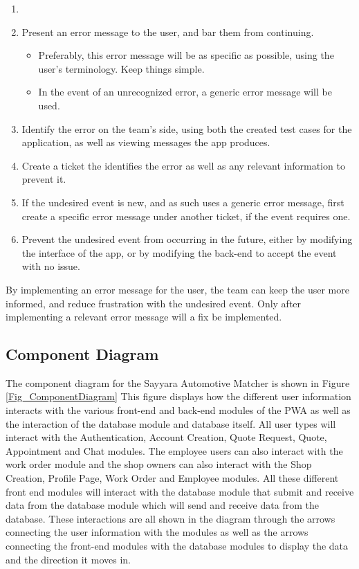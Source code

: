 \documentclass[12pt, titlepage]{article}
\begin{document}
\begin{enumerate}
    \item 
    \item Present an error message to the user, and bar them from continuing.
    \begin{itemize}
        \item Preferably, this error message will be as specific as possible, using the user's terminology. Keep things simple.
        \item In the event of an unrecognized error, a generic error message will be used.
    \end{itemize}
    \item Identify the error on the team's side, using both the created test cases for the application, as well as viewing messages the app produces.
    \item Create a ticket the identifies the error as well as any relevant information to prevent it.
    \item If the undesired event is new, and as such uses a generic error message, first create a specific error message under another ticket, if the event requires one.
    \item Prevent the undesired event from occurring in the future, either by modifying the interface of the app, or by modifying the back-end to accept the event with no issue.
\end{enumerate}

By implementing an error message for the user, the team can keep the user more informed, and reduce frustration with the undesired event. Only after implementing a relevant error message will a fix be implemented.

\subsection{Component Diagram}

\noindent
The component diagram for the Sayyara Automotive Matcher is shown in Figure \ref{Fig_ComponentDiagram} This figure displays how the different user information interacts with the various front-end and back-end modules of the PWA as well as the interaction of the database module and database itself. All user types will interact with the Authentication, Account Creation, Quote Request, Quote, Appointment and Chat modules. The employee users can also interact with the work order module and the shop owners can also interact with the Shop Creation, Profile Page, Work Order and Employee modules. All these different front end modules will interact with the database module that submit and receive data from the database module which will send and receive data from the database. These interactions are all shown in the diagram through the arrows connecting the user information with the modules as well as the arrows connecting the front-end modules with the database modules to display the data and the direction it moves in.
\end{document}

